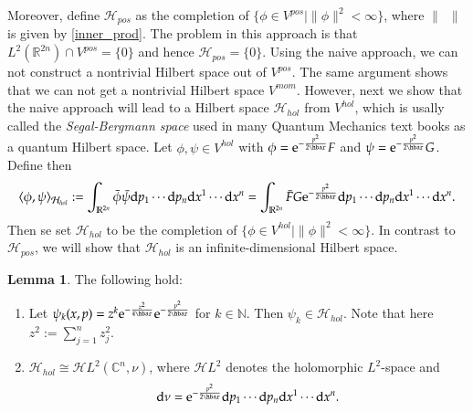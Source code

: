 \documentclass[11pt]{amsart}
\numberwithin{equation}{section}
\theoremstyle{plain}
\theoremstyle{definition}
\newtheorem{lem}{Lemma}[subsection]
\theoremstyle{remark}
\newcommand{\R}{\mathbb{R}}
\newcommand{\N}{\mathbb{N}}
\newcommand{\dd}{{\mathrm{d}}}
\newcommand{\calH}{\mathcal{H}}
\newcommand{\ee}{\textnormal{e}}
\begin{document}
Moreover, define $\calH_{pos}$ as the completion of $\{\phi\in V^{pos}\mid \|\phi\|^2<\infty\}$, where $\|\enspace\|$ is given by \eqref{inner_prod}. The problem in this approach is that $L^2(\R^{2n})\cap V^{pos}=\{0\}$ and hence $\calH_{pos}=\{0\}$. Using the naive approach, we can not construct a nontrivial Hilbert space out of $V^{pos}$. The same argument shows that we can not get a nontrivial Hilbert space $V^{mom}$. However, next we show that the naive approach will lead to a Hilbert space $\calH_{hol}$ from $V^{hol}$, which is usally called the \emph{Segal-Bergmann space} used in many Quantum Mechanics text books as a quantum Hilbert space. Let $\phi,\psi\in V^{hol}$ with $\phi=\ee^{-\frac{p^2}{2\hbar}}F$ and $\psi=\ee^{-\frac{p^2}{2\hbar}}G$. Define then $$\langle\phi,\psi\rangle_{\calH_{hol}}:=\int_{\R^{2n}}\bar\phi\bar\psi\dd p_1\dotsm\dd p_n\dd x^{1}\dotsm\dd x^n=\int_{\R^{2n}}\bar F G\ee^{-\frac{p^2}{2\hbar}}\dd p_1\dotsm\dd p_n\dd x^{1}\dotsm\dd x^n.$$
Then se set $\calH_{hol}$ to be the completion of $\{\phi\in V^{hol}\mid \| \phi\|^2<\infty\}$. In contrast to $\calH_{pos}$, we will show that $\calH_{hol}$ is an infinite-dimensional Hilbert space.

\begin{lem}
The following hold:
\begin{enumerate}
\item{Let $\psi_k(x,p)=z^k\ee^{-\frac{z^2}{4\hbar}}\ee^{-\frac{p^2}{2\hbar}}$ for $k\in\N$. Then $\psi_k\in\calH_{hol}$. Note that here $z^2:=\sum_{j=1}^nz_j^2$.
}
\item{$\calH_{hol}\cong \mathscr{H}L^2(\mathbb{C}^n,\nu)$, where $\mathscr{H}L^2$ denotes the holomorphic $L^2$-space and $$\dd\nu=\ee^{-\frac{p^2}{2\hbar}}\dd p_1\dotsm\dd p_n\dd x^{1}\dotsm\dd x^n.$$
}
\end{enumerate}
\end{lem}
\end{document}
